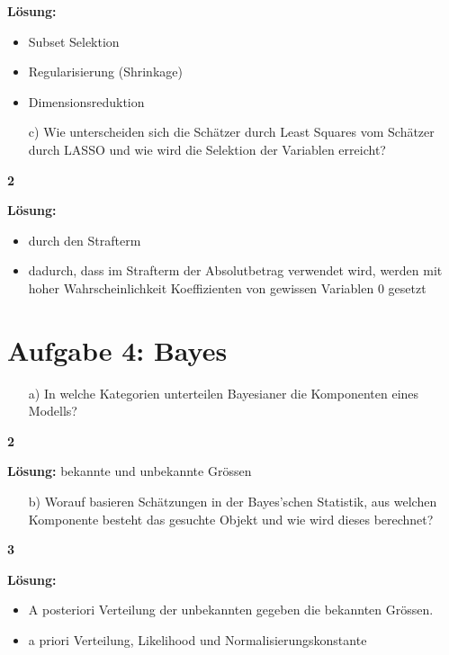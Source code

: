\documentclass{scrartcl}
\newcommand{\points}[1]
{\begin{flushright}\textbf{#1}\end{flushright}}
\begin{document}
\noindent\textbf{L\"osung:}
\begin{itemize}
\item Subset Selektion
\item Regularisierung (Shrinkage)
\item Dimensionsreduktion
\end{itemize}

\clearpage
\pagebreak

\begin{enumerate}
\item[c)] Wie unterscheiden sich die Sch\"atzer durch Least Squares vom Sch\"atzer durch LASSO und wie wird die Selektion der Variablen erreicht?
\end{enumerate}
\points{2}

\noindent\textbf{L\"osung:}
\begin{itemize}
\item durch den Strafterm
\item dadurch, dass im Strafterm der Absolutbetrag verwendet wird, werden mit hoher Wahrscheinlichkeit Koeffizienten von gewissen Variablen $0$ gesetzt
\end{itemize}


\clearpage
\pagebreak

\section*{Aufgabe 4: Bayes}

\begin{enumerate}
\item[a)] In welche Kategorien unterteilen Bayesianer die Komponenten eines Modells?
\end{enumerate}
\points{2}

\noindent\textbf{L\"osung:}
bekannte und unbekannte Gr\"ossen

\clearpage
\pagebreak

\begin{enumerate}
\item[b)] Worauf basieren Sch\"atzungen in der Bayes'schen Statistik, aus welchen Komponente besteht das gesuchte Objekt und wie wird dieses berechnet?
\end{enumerate}
\points{3}

\noindent\textbf{L\"osung:}
\begin{itemize}
\item  A posteriori Verteilung der unbekannten gegeben die bekannten Gr\"ossen.
\item  a priori Verteilung, Likelihood und Normalisierungskonstante
\end{itemize}
\end{document}
